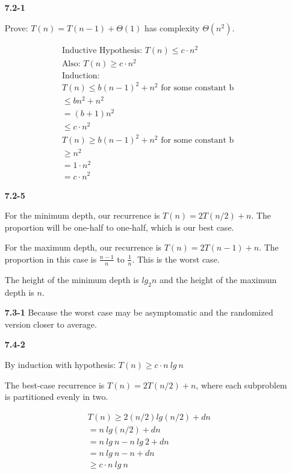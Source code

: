\documentclass{article}
\begin{document}
\begin{enumerate}

\item[\textbf{7.2-1}]

Prove: $T(n) = T(n-1) + \Theta(1)$ has complexity $\Theta(n^2)$.

	\begin{align*}
	\text{Inductive Hypothesis: } T(n) \leq c \cdot n^2 \\
	\text{Also: } T(n) \geq c \cdot n^2 \\
	\text{Induction: } \\
	T(n) \leq b(n-1)^2 + n^2 \text{ for some constant b }\\
	\leq bn^2 + n^2 \\
	= (b+1)n^2 \\
	\leq c \cdot n^2 \\
	T(n) \geq b(n-1)^2 + n^2 \text{ for some constant b }\\
	\geq n^2 \\
	= 1 \cdot n^2 \\
	= c \cdot n^2
	\end{align*}

\item[\textbf{7.2-5}]


For the minimum depth, our recurrence is $T(n) = 2T(n/2) + n$. The proportion will be one-half to one-half, which is our best case.

For the maximum depth, our recurrence is $T(n) = 2T(n-1) + n$. The proportion
in this case is $\frac{n-1}{n}$ to $\frac{1}{n}$. This is the worst case.

The height of the minimum depth is $lg_2 n$ and the height of the maximum depth is $n$.

\item[\textbf{7.3-1}]
Because the worst case may be asymptomatic and the randomized version closer to average.

\item[\textbf{7.4-2}]

By induction with hypothesis: $T(n) \geq c \cdot n\ lg\ n$

The best-case recurrence is $T(n) = 2T(n/2) + n$, where each subproblem is
partitioned evenly in two.

	\begin{align*}
	T(n) \geq 2(n/2)lg(n/2) + dn \\
	= n\ lg(n/2) + dn \\
	= n\ lg\ n - n\ lg\ 2 + dn \\
	= n\ lg\ n - n + dn \\
	\geq c \cdot n\ lg\ n \\
	\end{align*}


\end{enumerate}
\end{document}
